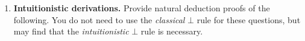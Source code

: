 \documentclass[11pt]{report}
\newcommand{\temp}[2]{{\overline{#2}}^{#1}}
\begin{document}
\begin{enumerate}
\begin{enumerate}
		\newpage
		\item $\lnot(A \lor  B) \ \vdash \lnot A\land \lnot B$
		
		\textbf{Solution:}

		\begin{center}
			$\begin{array}{c}
				\infer[\land I]{\lnot A \land \lnot B}
					{\infer[\to I, 1]{\lnot A}
						{\infer[\MP]{\bot}
							{\infer[\lor I_{r}]{A \lor B}
								{\temp{1}{A}}
							&
							\lnot (A \lor B)}}
					&
					\infer[\to I, 2]{\lnot B}
						{\infer[\MP]{\bot}
							{\infer[\lor I_{l}]{A \lor B}
								{\temp{2}{B}}
							&
							\lnot (A \lor B)}}}
			\end{array}$
		\end{center}

		\item $A \to \lnot B \ \vdash \ \lnot (A \land B)$
		
		\textbf{Solution:}

		\begin{center}
			$\begin{array}{c}
				\infer[\to I, 1]{\lnot(A \land B)}
					{\infer[\MP]{\bot}
						{\infer[\MP]{\lnot B}
							{\infer[\land E_{l}]{A}
								{\temp{1}{A \land B}}
							&
							A \to \lnot B}
						&
						\infer[\land E_{r}]{B}
							{\temp{1}{A \land B}}}}
			\end{array}$
		\end{center}

		\item $\vdash \ \lnot\lnot (A \lor \lnot A)$
		
		\textbf{Solution:}

		\begin{center}
			$\begin{array}{c}
				\infer[\to I, 1]{\lnot \lnot(A \lor \lnot A)}
					{\infer[\MP]{\bot}
						{\infer[\lor I_{l}]{A \lor \lnot A}
							{\infer[\to I, 2]{\lnot A}
								{\infer[\MP]{\bot}
									{\infer[\lor I_{r}]{A \lor \lnot A}
										{\temp{2}{A}}
									&
									\temp{1}{\lnot(A \lor \lnot A)}}}}
						&
						\temp{1}{\lnot(A \lor \lnot A)}}}
			\end{array}$
		\end{center}

		\newpage
	\end{enumerate}

	\item \textbf{Intuitionistic derivations.} Provide natural deduction proofs of the following. You do not need to use the \emph{classical} $\bot$ rule for these questions, but may find that the \emph{intuitionistic} $\bot$ rule is necessary.
	 

\end{enumerate}
\end{document}

